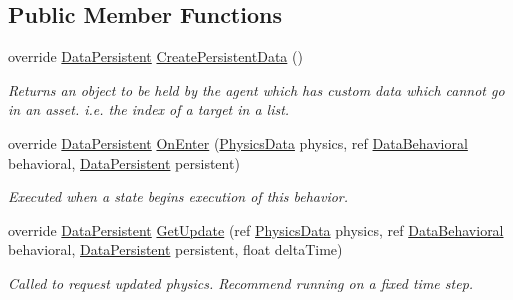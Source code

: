 \subsection*{Public Member Functions}
\begin{DoxyCompactItemize}
\item 
override \hyperlink{class_skyrates_1_1_a_i_1_1_behavior_1_1_data_persistent}{Data\-Persistent} \hyperlink{class_skyrates_1_1_a_i_1_1_decorator_1_1_stay_within_ab3b559b372f86b06eff82ace98e779fc}{Create\-Persistent\-Data} ()
\begin{DoxyCompactList}\small\item\em Returns an object to be held by the agent which has custom data which cannot go in an asset. i.\-e. the index of a target in a list. \end{DoxyCompactList}\item 
override \hyperlink{class_skyrates_1_1_a_i_1_1_behavior_1_1_data_persistent}{Data\-Persistent} \hyperlink{class_skyrates_1_1_a_i_1_1_decorator_1_1_stay_within_a85d8c19b0381acef752e41e8d8588706}{On\-Enter} (\hyperlink{class_skyrates_1_1_physics_1_1_physics_data}{Physics\-Data} physics, ref \hyperlink{class_skyrates_1_1_a_i_1_1_behavior_1_1_data_behavioral}{Data\-Behavioral} behavioral, \hyperlink{class_skyrates_1_1_a_i_1_1_behavior_1_1_data_persistent}{Data\-Persistent} persistent)
\begin{DoxyCompactList}\small\item\em Executed when a state begins execution of this behavior. \end{DoxyCompactList}\item 
override \hyperlink{class_skyrates_1_1_a_i_1_1_behavior_1_1_data_persistent}{Data\-Persistent} \hyperlink{class_skyrates_1_1_a_i_1_1_decorator_1_1_stay_within_aaf46fcbbb0521caa0fd20c73e97ebdf8}{Get\-Update} (ref \hyperlink{class_skyrates_1_1_physics_1_1_physics_data}{Physics\-Data} physics, ref \hyperlink{class_skyrates_1_1_a_i_1_1_behavior_1_1_data_behavioral}{Data\-Behavioral} behavioral, \hyperlink{class_skyrates_1_1_a_i_1_1_behavior_1_1_data_persistent}{Data\-Persistent} persistent, float delta\-Time)
\begin{DoxyCompactList}\small\item\em Called to request updated physics. Recommend running on a fixed time step. \end{DoxyCompactList}\end{DoxyCompactItemize}
